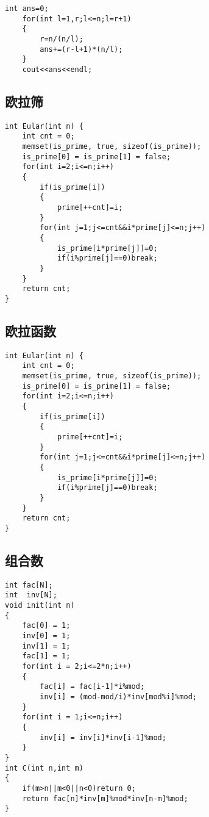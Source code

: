 \documentclass[]{article}
\begin{document}
\begin{verbatim}
int ans=0;
    for(int l=1,r;l<=n;l=r+1)
    {
        r=n/(n/l);
        ans+=(r-l+1)*(n/l);
    }
    cout<<ans<<endl;
\end{verbatim}

\hypertarget{ux6b27ux62c9ux7b5b}{%
\subsection{欧拉筛}\label{ux6b27ux62c9ux7b5b}}

\begin{verbatim}
int Eular(int n) {
    int cnt = 0;
    memset(is_prime, true, sizeof(is_prime));
    is_prime[0] = is_prime[1] = false;
    for(int i=2;i<=n;i++)
    {
        if(is_prime[i])
        {
            prime[++cnt]=i;
        }
        for(int j=1;j<=cnt&&i*prime[j]<=n;j++)
        {
            is_prime[i*prime[j]]=0;
            if(i%prime[j]==0)break;
        }
    }
    return cnt;
}
\end{verbatim}

\hypertarget{ux6b27ux62c9ux51fdux6570}{%
\subsection{欧拉函数}\label{ux6b27ux62c9ux51fdux6570}}

\begin{verbatim}
int Eular(int n) {
    int cnt = 0;
    memset(is_prime, true, sizeof(is_prime));
    is_prime[0] = is_prime[1] = false;
    for(int i=2;i<=n;i++)
    {
        if(is_prime[i])
        {
            prime[++cnt]=i;
        }
        for(int j=1;j<=cnt&&i*prime[j]<=n;j++)
        {
            is_prime[i*prime[j]]=0;
            if(i%prime[j]==0)break;
        }
    }
    return cnt;
}
\end{verbatim}

\hypertarget{ux7ec4ux5408ux6570}{%
\subsection{组合数}\label{ux7ec4ux5408ux6570}}

\begin{verbatim}
int fac[N];
int  inv[N];
void init(int n)
{
    fac[0] = 1;
    inv[0] = 1;
    inv[1] = 1;
    fac[1] = 1;
    for(int i = 2;i<=2*n;i++)
    {
        fac[i] = fac[i-1]*i%mod;
        inv[i] = (mod-mod/i)*inv[mod%i]%mod;
    }
    for(int i = 1;i<=n;i++)
    {
        inv[i] = inv[i]*inv[i-1]%mod;
    }
}
int C(int n,int m)
{
    if(m>n||m<0||n<0)return 0;
    return fac[n]*inv[m]%mod*inv[n-m]%mod;
}
\end{verbatim}
\end{document}
